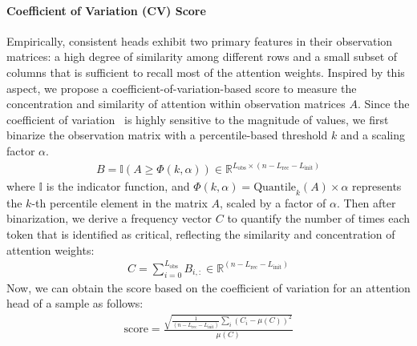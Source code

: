 \paragraph{Coefficient of Variation (CV) Score}
Empirically, consistent heads exhibit two primary features in their observation matrices: a high degree of similarity among different rows and a small subset of columns that is sufficient to recall most of the attention weights. Inspired by this aspect, we propose a coefficient-of-variation-based score to measure the concentration and similarity of attention within observation matrices $A$. Since the coefficient of variation~\cite{cv} is highly sensitive to the magnitude of values, we first binarize the observation matrix with a percentile-based threshold \( k\) and a scaling factor \( \alpha \).
\begin{align}\label{eq:binarization}
    B = \mathbb{I}\left( A \geq \Phi(k,\alpha) \right) \in \mathbb{R}^{L_{\text{obs}} \times \left(n-L_{\text{rec}}-L_{\text{init}}\right)}
\end{align}
where \( \mathbb{I} \) is the indicator function, and \( \Phi(k,\alpha) = \text{Quantile}_{k}(A) \times \alpha \) represents the \( k \)-th percentile element in the matrix \( A \), scaled by a factor of \( \alpha \). Then after binarization, we derive a frequency vector 
\( C \) to quantify the number of times each token that is identified as critical, reflecting the similarity and concentration of attention weights:
\begin{align}\label{eq:frequency-vector}
C = \sum_{i=0}^{L_{\text{obs}}} B_{i,:}\in \mathbb{R}^{\left(n-L_{\text{rec}}-L_{\text{init}}\right)} 
\end{align}
Now, we can obtain the score based on the coefficient of variation for an attention head of a sample as follows:
\begin{align}\label{eq:cv-score}
\text{score} = \frac{\sqrt{\frac{1}{\left(n-L_{\text{rec}}-L_{\text{init}}\right)} \sum_{i} (C_i - \mu(C))^2}}{\mu(C)} 
\end{align}
